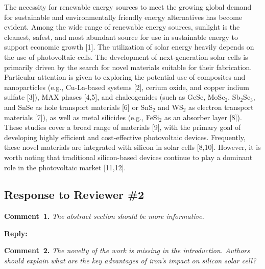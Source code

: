 \documentclass[a4paper,fleqn]{cas-sc}
\begin{document}
\begin{mdframed}
The necessity for renewable energy sources to meet the growing global demand for sustainable and environmentally friendly energy alternatives has become evident.
Among the wide range of renewable energy sources, sunlight is the cleanest, safest,
and most abundant source for use in sustainable energy to support economic growth [1].
The utilization of solar energy heavily depends on the use of photovoltaic cells.
\textcolor[rgb]{1.00,0.07,0.00}{
The development of next-generation solar cells is primarily driven by the search for novel materials suitable for their fabrication.
Particular attention is given to exploring the potential use of composites and nanoparticles
(e.g., Cu-La-based systems [2], cerium oxide, and copper indium sulfate [3]),
MAX phases [4,5],
and chalcogenides (such as GeSe, MoSe$_2$, Sb$_2$Se$_3$, and SnSe as hole transport materials [6]
or SnS$_2$ and WS$_2$ as electron transport materials [7]),
as well as metal silicides (e.g., FeSi$_2$ as an absorber layer [8]).
These studies cover a broad range of materials [9], with the primary goal of developing highly efficient and cost-effective photovoltaic devices.
Frequently, these novel materials are integrated with silicon in solar cells [8,10].
However, it is worth noting that traditional} silicon-based devices
\textcolor[rgb]{1.00,0.07,0.00}{continue} to play
\textcolor[rgb]{1.00,0.07,0.00}{a dominant role in the photovoltaic market} [11,12].
\end{mdframed}




\subsection*{Response to Reviewer \#2 }

\noindent
\textcolor[rgb]{0.00,0.50,1.00}{\textbf{Comment~1.}}
\emph{The abstract section should be more informative.}

\noindent
\textcolor[rgb]{0.51,0.00,0.00}{\textbf{Reply:}}


%


\noindent
\textcolor[rgb]{0.00,0.50,1.00}{\textbf{Comment~2.}}
\emph{The novelty of the work is missing in the introduction. Authors should explain what are the key advantages of iron's impact on silicon solar cell?}

\end{document}
